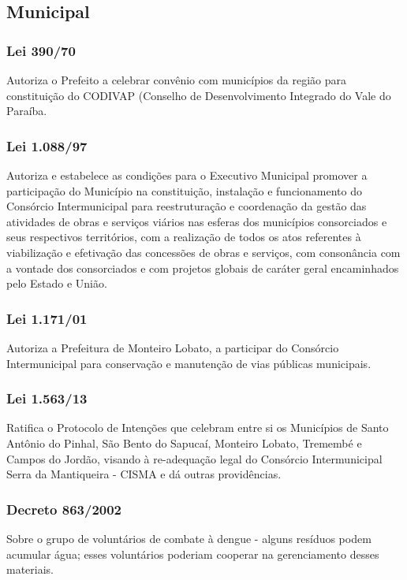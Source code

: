 \begin{subapend}
	\subsection{Municipal}
	\begin{subsubapend}
		\item \subsubsection{Lei 390/70}
		Autoriza o Prefeito a celebrar convênio com municípios da região para constituição do CODIVAP (Conselho de Desenvolvimento Integrado do Vale do Paraíba.
		\subsubsection{Lei 1.088/97}
		Autoriza e estabelece as condições para o Executivo Municipal promover a participação do Município na constituição, instalação e funcionamento do Consórcio Intermunicipal para reestruturação e coordenação da gestão das atividades de obras e serviços viários nas esferas dos municípios consorciados e seus respectivos territórios, com a realização de todos os atos referentes à viabilização e efetivação das concessões de obras e serviços, com consonância com a vontade dos consorciados e com projetos globais de caráter geral encaminhados pelo Estado e União.
		\subsubsection{Lei 1.171/01}
		Autoriza a Prefeitura de Monteiro Lobato, a participar do Consórcio Intermunicipal para conservação e manutenção de vias públicas municipais.
		\subsubsection{Lei 1.563/13}
		Ratifica o Protocolo de Intenções que celebram entre si os Municípios de Santo Antônio do Pinhal, São Bento do Sapucaí, Monteiro Lobato, Tremembé e Campos do Jordão, visando à re-adequação legal do Consórcio Intermunicipal Serra da Mantiqueira - CISMA e dá outras providências.
		\subsubsection{Decreto 863/2002}
		Sobre o grupo de voluntários de combate à dengue - alguns resíduos podem acumular água; esses voluntários poderiam cooperar na gerenciamento desses materiais.
	\end{subsubapend}
\end{subapend}

